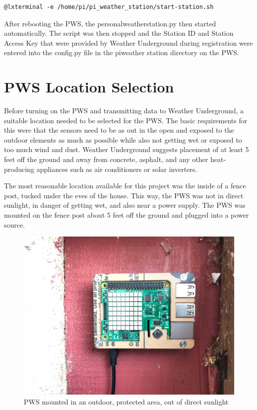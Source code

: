 \documentclass[sigconf]{acmart}
\begin{document}
\begin{code}
\begin{verbatim}
@lxterminal -e /home/pi/pi_weather_station/start-station.sh
\end{verbatim}
\end{code}

After rebooting the PWS, the personal\textunderscore weather\textunderscore station.py then started automatically. The script was then stopped and the Station ID and Station Access Key that were provided by Weather Underground during registration were entered into the config.py file in the pi\textunderscore weather \textunderscore station directory on the PWS.

\section{PWS Location Selection}

Before turning on the PWS and transmitting data to Weather Underground, a suitable location needed to be selected for the PWS. The basic requirements for this were that the sensors need to be as out in the open and exposed to the outdoor elements as much as possible while also not getting wet or exposed to too much wind and dust. Weather Underground suggests placement of at least 5 feet off the ground and away from concrete, asphalt, and any other heat-producing appliances such as air conditioners or solar inverters. 

The most reasonable location available for this project was the inside of a fence post, tucked under the eves of the house. This way, the PWS was not in direct sunlight, in danger of getting wet, and also near a power supply. The PWS was mounted on the fence post about 5 feet off the ground and plugged into a power source. 

\begin{figure}[H]
    \centering
    \includegraphics[scale=.10]{Location1.jpg}
    \caption{PWS mounted in an outdoor, protected area, out of direct sunlight}
\end{figure}
\end{document}
